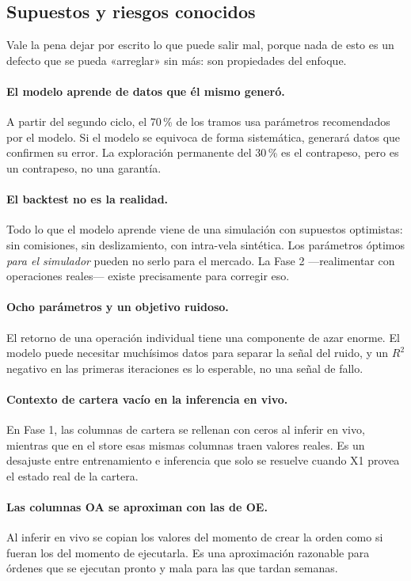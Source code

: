 \documentclass[11pt,a4paper]{article}
\begin{document}
\subsection{Supuestos y riesgos conocidos}

Vale la pena dejar por escrito lo que puede salir mal, porque nada de esto es un defecto que
se pueda «arreglar» sin más: son propiedades del enfoque.

\paragraph{El modelo aprende de datos que él mismo generó.} A partir del segundo ciclo, el
70\,\% de los tramos usa parámetros recomendados por el modelo. Si el modelo se equivoca de
forma sistemática, generará datos que confirmen su error. La exploración permanente del
30\,\% es el contrapeso, pero es un contrapeso, no una garantía.

\paragraph{El backtest no es la realidad.} Todo lo que el modelo aprende viene de una
simulación con supuestos optimistas: sin comisiones, sin deslizamiento, con intra-vela
sintética. Los parámetros óptimos \textit{para el simulador} pueden no serlo para el mercado.
La Fase 2 —realimentar con operaciones reales— existe precisamente para corregir eso.

\paragraph{Ocho parámetros y un objetivo ruidoso.} El retorno de una operación individual
tiene una componente de azar enorme. El modelo puede necesitar muchísimos datos para separar
la señal del ruido, y un $R^2$ negativo en las primeras iteraciones es lo esperable, no una
señal de fallo.

\paragraph{Contexto de cartera vacío en la inferencia en vivo.} En Fase 1, las columnas de
cartera se rellenan con ceros al inferir en vivo, mientras que en el store esas mismas
columnas traen valores reales. Es un desajuste entre entrenamiento e inferencia que solo se
resuelve cuando X1 provea el estado real de la cartera.

\paragraph{Las columnas OA se aproximan con las de OE.} Al inferir en vivo se copian los
valores del momento de crear la orden como si fueran los del momento de ejecutarla. Es una
aproximación razonable para órdenes que se ejecutan pronto y mala para las que tardan
semanas.
\end{document}
